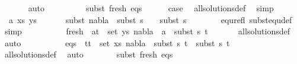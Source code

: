 \begin{isabellebody}
\ \ \ \ \ \isamarkupfalse%
\ auto\isanewline
\ \ \ \ \isanewline
\ \ \ \isamarkupfalse%
\ subst\ fresh\ eqs\ \isanewline
\ \ \ \isamarkupfalse%
\ {\isacharquery}{\kern0pt}case\ \isamarkupfalse%
\ all{\isacharunderscore}{\kern0pt}solutions{\isacharunderscore}{\kern0pt}def\ \isamarkupfalse%
\ simp\isanewline
\ \isamarkupfalse%
\isanewline
\ \ \ \isamarkupfalse%
\ {\isacharparenleft}{\kern0pt}{}\ a\ xs\ ys{\isacharparenright}{\kern0pt}\isanewline
\ \ \ \isamarkupfalse%
\ \isamarkupfalse%
\ subst{\isacharcolon}{\kern0pt}\ {\isachardoublequoteopen}nabla{}\ {\isasymTurnstile}\ subst\ {\isacharparenleft}{\kern0pt}s{}\ {\isasymbullet}\ {\isacharbrackleft}{\kern0pt}{\isacharbrackright}{\kern0pt}{\isacharparenright}{\kern0pt}\ {\isasymapprox}\ subst\ s{}{\isachardoublequoteclose}\ \isanewline
\ \ \ \ \ \isamarkupfalse%
\ equ{\isacharunderscore}{\kern0pt}refl\ subst{\isacharunderscore}{\kern0pt}equ{\isacharunderscore}{\kern0pt}def\ \isamarkupfalse%
\ simp\isanewline
\isanewline
\ \ \ \isamarkupfalse%
\ {}\isanewline
\ \ \ \isamarkupfalse%
\ fresh{\isacharcolon}{\kern0pt}\ {\isachardoublequoteopen}{\isasymforall}\ {\isacharparenleft}{\kern0pt}a{\isacharcomma}{\kern0pt}t{\isacharparenright}{\kern0pt}\ {\isasymin}\ set\ ys{\isachardot}{\kern0pt}\ nabla{}\ {\isasymturnstile}\ a\ {\isasymsharp}\ subst\ s{}\ t{\isachardoublequoteclose}\isanewline
\ \ \ \ \ \isamarkupfalse%
\ all{\isacharunderscore}{\kern0pt}solutions{\isacharunderscore}{\kern0pt}def\ \isamarkupfalse%
\ auto\isanewline
\isanewline
\ \ \ \isamarkupfalse%
\ {}\isanewline
\ \ \ \isamarkupfalse%
\ eqs{\isacharcolon}{\kern0pt}\ {\isachardoublequoteopen}{\isasymforall}\ {\isacharparenleft}{\kern0pt}t{}{\isacharcomma}{\kern0pt}t{}{\isacharparenright}{\kern0pt}\ {\isasymin}\ set\ xs{\isachardot}{\kern0pt}\ nabla{}\ {\isasymturnstile}\ subst\ s{}\ t{}\ {\isasymapprox}\ subst\ s{}\ t{}{\isachardoublequoteclose}\isanewline
\ \ \ \ \ \isamarkupfalse%
\ all{\isacharunderscore}{\kern0pt}solutions{\isacharunderscore}{\kern0pt}def\ \isamarkupfalse%
\ auto\isanewline
\ \ \isanewline
\ \ \ \isamarkupfalse%
\ subst\ fresh\ eqs\isanewline

\end{isabellebody}

